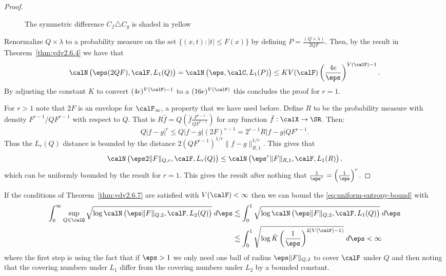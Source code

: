 \begin{proof}
\begin{figure}[htpb]
\begin{tikzpicture}
		\end{tikzpicture}
		\caption{The symmetric difference \(C_f\triangle C_g\) is shaded in yellow}%
		\label{fig:symmetric-diff}	
	\end{figure}
	Renormalize \(Q\times\lambda\) to a probability measure on the set \(\{(x,t): |t|\leq F(x)\}\) by defining \(P = \frac{(Q\times\lambda)}{2QF}\). Then, by the result in Theorem~\ref{thm:vdv2.6.4} we have that
	\[
		\calN\left(\eps(2QF), \calF, L_1(Q)\right) = \calN\left(\eps,\calC,L_1(P)\right) \leq  KV(\calF)\left(\frac{4e}{\eps}\right)^{V(\calF)-1}
	.\]
	By adjusting the constant \(K\) to convert \((4e)^{V(\calF)-1}\) to a \((16e)^{V(\calF)}\) this concludes the proof for \(r=1\).

	For \(r > 1\) note that \(2F\) is an envelope for \(\calF_\infty\), a property that we have used before. Define \(R\) to be the probability measure with density \(F^{r-1}/QF^{r-1} \) with respect to \(Q\). That is \(R\bar f = Q\left(\bar f\frac{F^{r-1}}{QF^{r-1}}\right)\) for any function \(\bar f:\calX\to\SR\). Then:
	\[
		Q|f-g|^r \leq  Q|f-g|(2F)^{r-1} = 2^{r-1}R|f-g|QF^{r-1} 
	.\]
	Thus the \(L_r(Q)\) distance is bounded by the distance \(2(QF^{r-1})^{1/r}\|f-g\|_{R,1}^{1/r}\). This gives that 
	\[
		\calN\left(\eps 2\|F\|_{Q,r},\calF,L_r(Q)\right) \leq \calN\left(\eps^r \|F\|_{R,1},\calF,L_1(R)\right)
	.\] 
	which can be uniformly bounded by the result for \(r=1\). This gives the result after nothing that \(\frac{1}{\eps^r} = \left(\frac{1}{\eps}\right)^r\).
\end{proof}
If the conditions of Theorem~\ref{thm:vdv2.6.7} are satisfied with \(V(\calF) < \infty\) then we can bound the \eqref{eq:uniform-entropy-bound} with
\begin{align*}
	\int_{0}^{\infty} \sup_{Q\in\calQ} \sqrt{\log\calN\left(\eps\|F\|_{Q,2},\calF,L_2(Q)\right)}\;d\eps 
	&\lesssim \int_{0}^{1} \sqrt{\log\calN\left(\eps\|F\|_{Q,2},\calF,L_1(Q)\right)}\;d\eps \\  
	&\lesssim \int_{0}^{1} \sqrt{\log \tilde K \left(\frac{1}{\eps}\right)^{2(V(\calF)-1)}}\;d\eps < \infty 
\end{align*}
where the first step is using the fact that if \(\eps > 1\) we only need one ball of radius \(\eps\|F\|_{Q,2}\) to cover \(\calF\) under \(Q\)  and then noting that the covering numbers under \(L_1\) differ from the covering numbers under \(L_2\) by a bounded constant.

